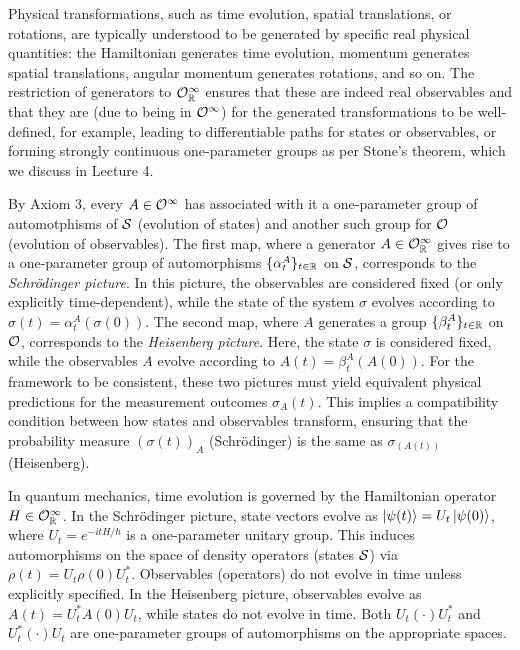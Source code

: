 Physical transformations, such as time evolution, spatial translations, or rotations, are typically understood to be generated by specific real physical quantities: the Hamiltonian generates time evolution, momentum generates spatial translations, angular momentum generates rotations, and so on. The restriction of generators to $\mathcal{O}_{\mathbb{R}}^{\infty}$ ensures that these are indeed real observables and that they are  (due to being in $\mathcal{O}^{\infty}$) for the generated transformations to be well-defined, for example, leading to differentiable paths for states or observables, or forming strongly continuous one-parameter groups as per Stone's theorem, which we discuss in Lecture 4.

By Axiom 3, every $A \in \mathcal{O}^{\infty}$ has associated with it a one-parameter group of automotphisms of $\mathcal{S}$ (evolution of states) and another such group for $\mathcal{O}$ (evolution of observables). The first map, where a generator $A \in \mathcal{O}_{\mathbb{R}}^{\infty}$ gives rise to a one-parameter group of automorphisms $\{\alpha_t^A\}_{t\in\mathbb{R}}$ on $\mathcal{S}$, corresponds to the \textit{Schrödinger picture}. In this picture, the observables are considered fixed (or only explicitly time-dependent), while the state of the system $\sigma$ evolves according to $\sigma(t) = \alpha_t^A(\sigma(0))$. The second map, where $A$ generates a group $\{\beta_t^A\}_{t\in\mathbb{R}}$ on $\mathcal{O}$, corresponds to the \textit{Heisenberg picture}. Here, the state $\sigma$ is considered fixed, while the observables $A$ evolve according to $A(t) = \beta_t^A(A(0))$. For the framework to be consistent, these two pictures must yield equivalent physical predictions for the measurement outcomes $\sigma_A(t)$. This implies a compatibility condition between how states and observables transform, ensuring that the probability measure $\left(\sigma(t)\right)_A$ (Schrödinger) is the same as $\sigma_{\left(A(t)\right)}$ (Heisenberg).

\begin{example}
In quantum mechanics, time evolution is governed by the Hamiltonian operator $H \in \mathcal{O}_{\mathbb{R}}^{\infty}$. In the Schrödinger picture, state vectors evolve as $\ket{\psi(t)} = U_t \ket{\psi(0)}$, where $U_t = e^{-itH/\hbar}$ is a one-parameter unitary group. This induces automorphisms on the space of density operators (states $\mathcal{S}$) via $\rho(t) = U_t \rho(0) U_t^*$. Observables (operators) do not evolve in time unless explicitly specified. In the Heisenberg picture, observables evolve as $A(t) = U_t^* A(0) U_t$, while states do not evolve in time. Both $U_t(\cdot)U_t^*$ and $U_t^*(\cdot)U_t$ are one-parameter groups of automorphisms on the appropriate spaces.
\end{example}

